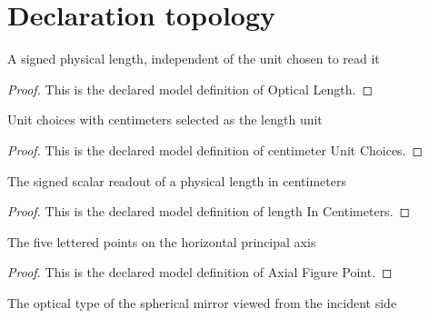 \section{Declaration topology}
\begin{definition}
  \label{def:physics:phyx-mini-0140:phyxminiproblems-problemphyxmini0140-opticallength}
  A signed physical length, independent of the unit chosen to read it
\end{definition}
\begin{proof}
  This is the declared model definition of Optical Length.
\end{proof}
\begin{definition}
  \label{def:physics:phyx-mini-0140:phyxminiproblems-problemphyxmini0140-centimeterunitchoices}
  Unit choices with centimeters selected as the length unit
\end{definition}
\begin{proof}
  This is the declared model definition of centimeter Unit Choices.
\end{proof}
\begin{definition}
  \label{def:physics:phyx-mini-0140:phyxminiproblems-problemphyxmini0140-lengthincentimeters}
  The signed scalar readout of a physical length in centimeters
\end{definition}
\begin{proof}
  This is the declared model definition of length In Centimeters.
\end{proof}
\begin{definition}
  \label{def:physics:phyx-mini-0140:phyxminiproblems-problemphyxmini0140-axialfigurepoint}
  The five lettered points on the horizontal principal axis
\end{definition}
\begin{proof}
  This is the declared model definition of Axial Figure Point.
\end{proof}
\begin{definition}
  \label{def:physics:phyx-mini-0140:phyxminiproblems-problemphyxmini0140-sphericalmirrorkind}
  The optical type of the spherical mirror viewed from the incident side
\end{definition}
